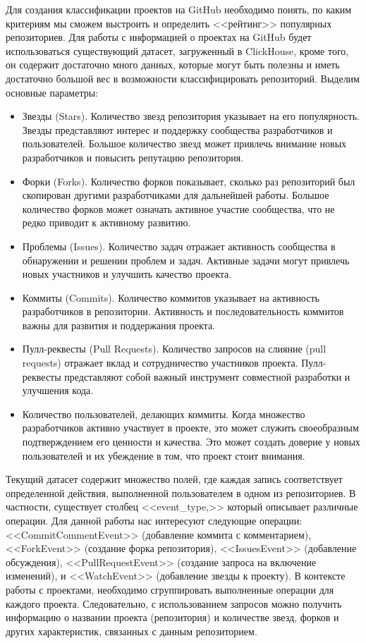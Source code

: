  Для создания классификации проектов на GitHub необходимо понять, по каким критериям мы сможем выстроить и определить <<рейтинг>> популярных репозиториев. Для работы с информацией о проектах на GitHub будет использоваться существующий датасет, загруженный в ClickHouse, кроме того, он содержит достаточно много данных, которые могут быть полезны и иметь достаточно большой вес в возможности классифицировать репозиторий. Выделим основные параметры:
 \begin{itemize}
     \item Звезды (Stars). Количество звезд  репозитория указывает на его популярность. Звезды представляют интерес и поддержку сообщества разработчиков и пользователей. Большое количество звезд может привлечь внимание новых разработчиков и повысить репутацию репозитория.
     \item Форки (Forks). Количество форков показывает, сколько раз репозиторий был скопирован другими разработчиками для дальнейшей работы. Большое количество форков может означать активное участие сообщества, что не редко приводит к активному развитию.
    \item Проблемы (Issues). Количество задач отражает активность сообщества в обнаружении и решении проблем и задач. Активные задачи могут привлечь новых участников и улучшить качество проекта.
    \item Коммиты (Commits). Количество коммитов указывает на активность разработчиков в репозитории. Активность и последовательность коммитов важны для развития и поддержания проекта.
    \item Пулл-реквесты (Pull Requests). Количество запросов на слияние (pull requests) отражает вклад и сотрудничество участников проекта. Пулл-реквесты представляют собой важный инструмент совместной разработки и улучшения кода.
    \item Количество пользователей, делающих коммиты. Когда множество разработчиков активно участвует в проекте, это может служить своеобразным подтверждением его ценности и качества. Это может создать доверие у новых пользователей и их убеждение в том, что проект стоит внимания.
 \end{itemize}

 Текущий датасет содержит множество полей, где каждая запись соответствует определенной действия, выполненной пользователем в одном из репозиториев. В частности, существует столбец <<event\_type,>> который описывает различные операции. Для данной работы нас интересуют следующие операции: <<CommitCommentEvent>> (добавление коммита с комментарием), <<ForkEvent>> (создание форка репозитория), <<IssuesEvent>> (добавление обсуждения), <<PullRequestEvent>> (создание запроса на включение изменений), и <<WatchEvent>> (добавление звезды к проекту). В контексте работы с проектами, необходимо сгруппировать выполненные операции для каждого проекта. Следовательно, с использованием запросов можно получить информацию о названии проекта (репозитория) и количестве звезд, форков и других характеристик, связанных с данным репозиторием.

